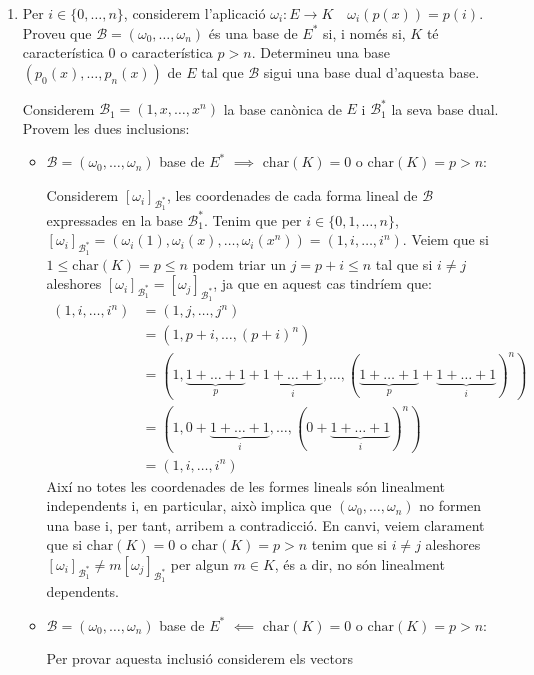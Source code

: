 \documentclass[11pt,a4paper]{article}
\begin{document}
\begin{enumerate}
\begin{enumerate}
        \item Per $i\in\{0,\ldots,n\}$, considerem l'aplicació $\omega_i:E\longrightarrow K\quad\omega_i(p(x))=p(i)$. Proveu que $\mathcal{B}=(\omega_0,\ldots,\omega_n)$ és una base de $E^*$ si, i  només si, $K$ té característica $0$ o característica $p>n$. Determineu una base $(p_0(x),\ldots,p_n(x))$ de $E$ tal que $\mathcal{B}$ sigui una base dual d'aquesta base.\par
        Considerem $\mathcal{B}_1=(1,x,\ldots,x^n)$ la base canònica de $E$ i $\mathcal{B}_1^*$ la seva base dual. Provem les dues inclusions:
        \begin{itemize}
            \item $\mathcal{B}=(\omega_0,\ldots,\omega_n)$ base de $E^*$ $\implies$ $\text{char}(K)=0$ o $\text{char}(K)=p>n$:\par
            Considerem $[\omega_i]_{\mathcal{B}_1^*}$, les coordenades de cada forma lineal de $\mathcal{B}$ expressades en la base $\mathcal{B}_1^*$. Tenim que per $i\in\{0,1,\ldots,n\}$, $[\omega_i]_{\mathcal{B}_1^*}=(\omega_i(1),\omega_i(x),\ldots,\omega_i(x^n))=(1,i,\ldots,i^n)$. Veiem que si $1\leq \text{char}(K)=p\leq n$ podem triar un $j=p+i\leq n$ tal que si $i\neq j$ aleshores $[\omega_i]_{\mathcal{B}_1^*}=[\omega_j]_{\mathcal{B}_1^*}$, ja que en aquest cas tindríem que:
            \begin{align*}
                (1,i,\ldots,i^n)&=(1,j,\ldots,j^n)\\
                &=(1,p+i,\ldots,(p+i)^n)\\
                &=(1,\underbrace{1+\ldots+1}_p+\underbrace{1+\ldots+1}_i,\ldots,(\underbrace{1+\ldots+1}_p+\underbrace{1+\ldots+1}_i)^n)\\
                &=(1,0+\underbrace{1+\ldots+1}_i,\ldots,(0+\underbrace{1+\ldots+1}_i)^n)\\
                &=(1,i,\ldots,i^n)
            \end{align*}
            Així no totes les coordenades de les formes lineals són linealment independents i, en particular, això implica que $(\omega_0,\ldots,\omega_n)$ no formen una base i, per tant, arribem a contradicció. En canvi, veiem clarament que si $\text{char}(K)=0$ o $\text{char}(K)=p>n$ tenim que si $i\neq j$ aleshores $[\omega_i]_{\mathcal{B}_1^*}\neq m[\omega_j]_{\mathcal{B}_1^*}$ per algun $m\in K$, és a dir, no són linealment dependents.
            \item $\mathcal{B}=(\omega_0,\ldots,\omega_n)$ base de $E^*$ $\impliedby$ $\text{char}(K)=0$ o $\text{char}(K)=p>n$:\par Per provar aquesta inclusió considerem els vectors

\end{itemize}
\end{enumerate}
\end{enumerate}
\end{document}
